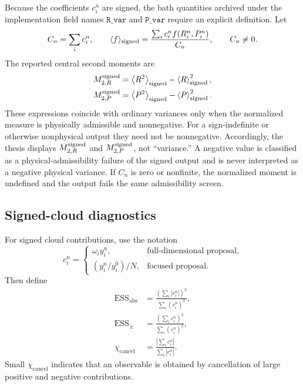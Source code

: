 \documentclass[
  11pt,
  letterpaper,
  onehalfspacing,
  normalmargins,
  equalmargins,
  oneside
]{ut-thesis}
\begin{document}
Because the coefficients \(c_i^n\) are signed, the bath quantities archived
under the implementation field names \(\texttt{R\_var}\) and
\(\texttt{P\_var}\) require an explicit definition. Let
\begin{equation}
C_n=\sum_i c_i^n,\qquad
\langle f\rangle_{\rm signed}
=
\frac{\sum_i c_i^n f(R_i^n,P_i^n)}{C_n},\qquad C_n\ne0.
\label{appeq:signed-cloud-average}
\end{equation}
The reported central second moments are
\begin{align}
M^{\rm signed}_{2,R}
&=
\left\langle R^2\right\rangle_{\rm signed}
-\left\langle R\right\rangle_{\rm signed}^{2},
\label{appeq:signed-central-R}\\
M^{\rm signed}_{2,P}
&=
\left\langle P^2\right\rangle_{\rm signed}
-\left\langle P\right\rangle_{\rm signed}^{2}.
\label{appeq:signed-central-P}
\end{align}
These expressions coincide with ordinary variances only when the normalized
measure is physically admissible and nonnegative. For a sign-indefinite or
otherwise nonphysical output they need not be nonnegative. Accordingly, the
thesis displays \(M^{\rm signed}_{2,R}\) and \(M^{\rm signed}_{2,P}\), not
``variance.'' A negative value is classified as a physical-admissibility
failure of the signed output and is never interpreted as a negative physical
variance. If \(C_n\) is zero or nonfinite, the normalized moment is undefined
and the output fails the same admissibility screen.

\subsection{Signed-cloud diagnostics}
\label{appsubsec:signed-cloud-diagnostics}

For signed cloud contributions, use the notation
\begin{equation}
c_i^n
=
\begin{cases}
\omega_i y_i^n, & \text{full-dimensional proposal},\\[2pt]
(y_i^n/y_i^0)/N, & \text{focused proposal}.
\end{cases}
\label{appeq:appendix-signed-contributions}
\end{equation}
Then define
\begin{align}
\mathrm{ESS}_{\mathrm{abs}}
&=
\frac{
\left(
\sum_i|c_i^n|
\right)^2
}{
\sum_i(c_i^n)^2
},
\\
\mathrm{ESS}_{\pm}
&=
\frac{
\left(
\sum_i c_i^n
\right)^2
}{
\sum_i(c_i^n)^2
},
\\
\chi_{\mathrm{cancel}}
&=
\frac{
\left|
\sum_i c_i^n
\right|
}{
\sum_i|c_i^n|
}.
\label{appeq:signed-cloud-diagnostics}
\end{align}
Small \(\chi_{\mathrm{cancel}}\) indicates that an observable is obtained by
cancellation of large positive and negative contributions.
\end{document}
